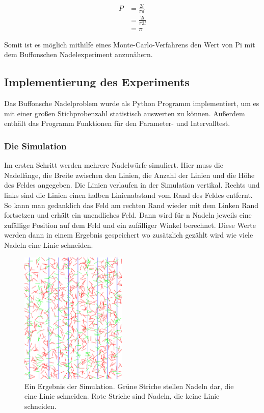 \documentclass[10pt,twocolumn]{scrartcl}
\begin{document}
		\begin{align}
			P &= \frac{2l}{\pi d}\\ \nonumber
			&= \frac{2l}{\pi 2l}\\ \nonumber
			&= \pi \nonumber
		\end{align}
		
		Somit ist es möglich mithilfe eines Monte-Carlo-Verfahrens den Wert von Pi mit dem Buffonschen Nadelexperiment anzunähern.

	\subsection{Implementierung des Experiments}
		Das Buffonsche Nadelproblem wurde als Python\cite{Python} Programm implementiert, um es mit einer großen Stichprobenzahl statistisch auswerten zu können. Außerdem enthält das Programm Funktionen für den Parameter- und Intervalltest.

		\subsubsection*{Die Simulation}
			Im ersten Schritt werden mehrere Nadelwürfe simuliert. Hier muss die Nadellänge, die Breite zwischen den Linien, die Anzahl der Linien und die Höhe des Feldes angegeben. Die Linien verlaufen in der Simulation vertikal. Rechts und links sind die Linien einen halben Linienabstand vom Rand des Feldes entfernt. So kann man gedanklich das Feld am rechten Rand wieder mit dem Linken Rand fortsetzen und erhält ein unendliches Feld. Dann wird für n Nadeln jeweils eine zufällige Position auf dem Feld und ein zufälliger Winkel berechnet. Diese Werte werden dann in einem Ergebnis gespeichert wo zusätzlich gezählt wird wie viele Nadeln eine Linie schneiden.

			\begin{figure}[htb]
				\centering
				\includegraphics[width=0.45\textwidth]{images/needels.png}
				\caption{Ein Ergebnis der Simulation. Grüne Striche stellen Nadeln dar, die eine Linie schneiden. Rote Striche sind Nadeln, die keine Linie schneiden.}
				\label{fig:needels}
			\end{figure}
\end{document}
